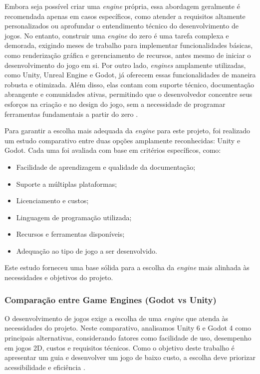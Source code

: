 Embora seja possível criar uma \textit{engine} própria, essa abordagem geralmente é recomendada apenas em casos específicos, como atender a requisitos altamente personalizados ou aprofundar o entendimento técnico do desenvolvimento de jogos. No entanto, construir uma \textit{engine} do zero é uma tarefa complexa e demorada, exigindo meses de trabalho para implementar funcionalidades básicas, como renderização gráfica e gerenciamento de recursos, antes mesmo de iniciar o desenvolvimento do jogo em si. Por outro lado, \textit{engines} amplamente utilizadas, como Unity, Unreal Engine e Godot, já oferecem essas funcionalidades de maneira robusta e otimizada. Além disso, elas contam com suporte técnico, documentação abrangente e comunidades ativas, permitindo que o desenvolvedor concentre seus esforços na criação e no design do jogo, sem a necessidade de programar ferramentas fundamentais a partir do zero \cite{ullmann2022}.

Para garantir a escolha mais adequada da \textit{engine} para este projeto, foi realizado um estudo comparativo entre duas opções amplamente reconhecidas: Unity e Godot. Cada uma foi avaliada com base em critérios específicos, como:

\begin{itemize}
    \item Facilidade de aprendizagem e qualidade da documentação;
    \item Suporte a múltiplas plataformas;
    \item Licenciamento e custos;
    \item Linguagem de programação utilizada;
    \item Recursos e ferramentas disponíveis;
    \item Adequação ao tipo de jogo a ser desenvolvido.
\end{itemize}

Este estudo forneceu uma base sólida para a escolha da \textit{engine} mais alinhada às necessidades e objetivos do projeto.

\subsubsection{Comparação entre Game Engines (Godot vs Unity)}

O desenvolvimento de jogos exige a escolha de uma \textit{engine} que atenda às necessidades do projeto. Neste comparativo, analisamos Unity 6 e Godot 4 como principais alternativas, considerando fatores como facilidade de uso, desempenho em jogos 2D, custos e requisitos técnicos. Como o objetivo deste trabalho é apresentar um guia e desenvolver um jogo de baixo custo, a escolha deve priorizar acessibilidade e eficiência \cite{godot-sysreq} \cite{unity-sysreq}.

